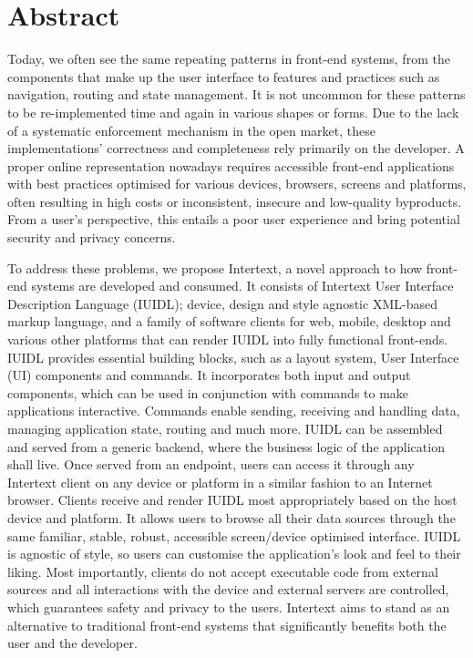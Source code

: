 

\section*{Abstract} \label{abstract}

Today, we often see the same repeating patterns in front-end systems, from the components that make up the user interface to features and practices such as navigation, routing and state management. It is not uncommon for these patterns to be re-implemented time and again in various shapes or forms. Due to the lack of a systematic enforcement mechanism in the open market, these implementations' correctness and completeness rely primarily on the developer. A proper online representation nowadays requires accessible front-end applications with best practices optimised for various devices, browsers, screens and platforms, often resulting in high costs or inconsistent, insecure and low-quality byproducts. From a user's perspective, this entails a poor user experience and bring potential security and privacy concerns. 

To address these problems, we propose Intertext, a novel approach to how front-end systems are developed and consumed. It consists of Intertext User Interface Description Language (IUIDL); device, design and style agnostic XML-based markup language, and a family of software clients for web, mobile, desktop and various other platforms that can render IUIDL into fully functional front-ends. IUIDL provides essential building blocks, such as a layout system, User Interface (UI) components and commands. It incorporates both input and output components, which can be used in conjunction with commands to make applications interactive. Commands enable sending, receiving and handling data, managing application state, routing and much more. IUIDL can be assembled and served from a generic backend, where the business logic of the application shall live. Once served from an endpoint, users can access it through any Intertext client on any device or platform in a similar fashion to an Internet browser. Clients receive and render IUIDL most appropriately based on the host device and platform. It allows users to browse all their data sources through the same familiar, stable, robust, accessible screen/device optimised interface. IUIDL is agnostic of style, so users can customise the application's look and feel to their liking. Most importantly, clients do not accept executable code from external sources and all interactions with the device and external servers are controlled, which guarantees safety and privacy to the users. Intertext aims to stand as an alternative to traditional front-end systems that significantly benefits both the user and the developer.